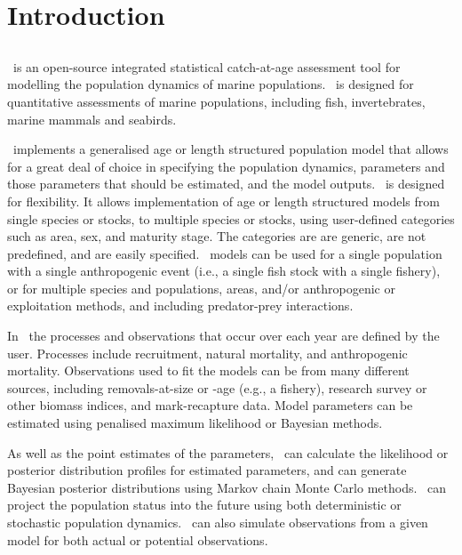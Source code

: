 \section{Introduction\label{sec:Introduction}}

\subsection{}

\CNAME\ is an open-source integrated statistical catch-at-age assessment tool for modelling the population dynamics of marine populations. \CNAME\ is designed for quantitative assessments of marine populations, including fish, invertebrates, marine mammals and seabirds.

\CNAME\ implements a generalised age or length structured population model that allows for a great deal of choice in specifying the population dynamics, parameters and those parameters that should be estimated, and the model outputs. \CNAME\ is designed for flexibility. It allows implementation of age or length structured models from single species or stocks, to multiple species or stocks, using user-defined categories such as area, sex, and maturity stage. The categories are are generic, are not predefined, and are easily specified. \CNAME\ models can be used for a single population with a single anthropogenic event (i.e., a single fish stock with a single fishery), or for multiple species and populations, areas, and/or anthropogenic or exploitation methods, and including predator-prey interactions.

In \CNAME\ the processes and observations that occur over each year are defined by the user. Processes include recruitment, natural mortality, and anthropogenic mortality. Observations used to fit the models can be from many different sources, including removals-at-size or -age (e.g., a fishery), research survey or other biomass indices, and mark-recapture data. Model parameters can be estimated using penalised maximum likelihood or Bayesian methods.

As well as the point estimates of the parameters, \CNAME\ can calculate the likelihood or posterior distribution profiles for estimated parameters, and can generate Bayesian posterior distributions using Markov chain Monte Carlo methods. \CNAME\ can project the population status into the future using both deterministic or stochastic population dynamics. \CNAME\ can also simulate observations from a given model for both actual or potential observations.


